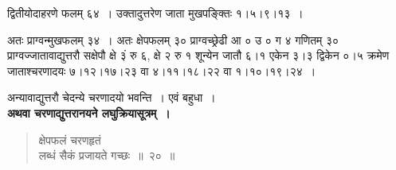 \documentclass[11pt, openany]{book}
\begin{document}
द्वितीयोदाहरणे फलम् ६४~। उक्तादुत्तरेण जाता मुखपङ्क्तिः १।५।९।१३~। 
\vspace{2mm}

अतः प्राग्वन्मुखफलम् ३४~। अतः क्षेपफलम् ३० प्राग्वच्छ्रेढी आ ० उ ० ग ४ गणितम् ३० प्राग्वज्जातावाद्युत्तरौ सक्षेपौ क्षे ३ं रु ६, क्षे २ रु १ शून्येन जातौ ६।१ एकेन ३।३ द्विकेन ०।५ क्रमेण जाताश्चरणादयः ७।१२।१७।२३ वा ४।११।१८।२२ वा १।१०।१९।२४~।
\vspace{2mm}

अन्यावाद्युत्तरौ चेदन्ये चरणादयो भवन्ति~। एवं बहुधा~।\\

\textbf{अथवा चरणाद्युत्तरानयने लघुक्रियासूत्रम्~।}

\begin{quote}
{\gk क्षेपफलं चरणहृतं\\
लब्धं सैकं प्रजायते गच्छः~॥~२०~॥}
\end{quote}

\newpage
\end{document}
